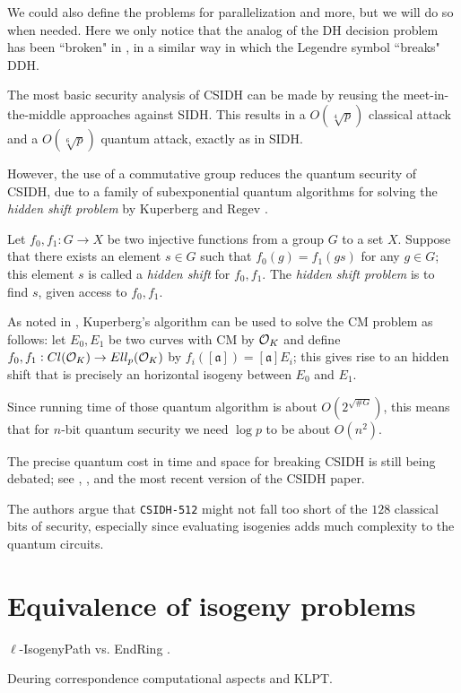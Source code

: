 We could also define the problems for parallelization and more, but we will do so when needed. Here we only notice that the analog of the DH decision problem has been ``broken" in \cite{breaking_DDH}, in a similar way in which the Legendre symbol ``breaks" DDH.

The most basic security analysis of CSIDH can be made by reusing the meet-in-the-middle approaches against SIDH. This results in a $O(\sqrt[4]{p})$ classical attack and a $O(\sqrt[6]{p})$ quantum attack, exactly as in SIDH.

However, the use of a commutative group reduces the quantum security of CSIDH, due to a family of subexponential quantum algorithms for solving the \emph{hidden shift problem} by Kuperberg \cite{Kuperberg2005} and Regev \cite{Regev_hshp}.
\begin{definition}
    Let $f_0,f_1:G\to X$ be two injective functions from a group $G$ to a set $X$. Suppose that there exists an element $s\in G$ such that $f_0(g)=f_1(gs)$ for any $g\in G$; this element $s$ is called a \emph{hidden shift} for $f_0,f_1$. The \emph{hidden shift problem} is to find $s$, given access to $f_0,f_1$.
\end{definition}
As noted in \cite{Childs_hshsp}, Kuperberg's algorithm can be used to solve the CM problem as follows: let $E_0,E_1$ be two curves with CM by $\mathcal{O}_K$ and define $f_0,f_1:Cl(\mathcal{O}_K)\to Ell_p(\mathcal{O}_K)$ by $f_i([\mathfrak{a}]) = [\mathfrak{a}]E_i$; this gives rise to an hidden shift that is precisely an horizontal isogeny between $E_0$ and $E_1$.

Since running time of those quantum algorithm is about $O(2^{\sqrt{\# G}})$, this means that for $n$-bit quantum security we need $\log p$ to be about $O(n^2)$.
    
The precise quantum cost in time and space for breaking CSIDH is still being debated; see \cite{CSIDH_Peikert}, \cite{CSIDH_BS}, \cite{CSIDH_qiso} and the most recent version of the CSIDH paper.

The authors argue that \texttt{CSIDH-512} might not fall too short of the $128$ classical bits of security, especially since evaluating isogenies adds much complexity to the quantum circuits.

\section{Equivalence of isogeny problems}
$\ell$-IsogenyPath vs. EndRing \cite{Weso_EndRing}.

Deuring correspondence computational aspects and KLPT.

\cite{Weso_CSIDH}
